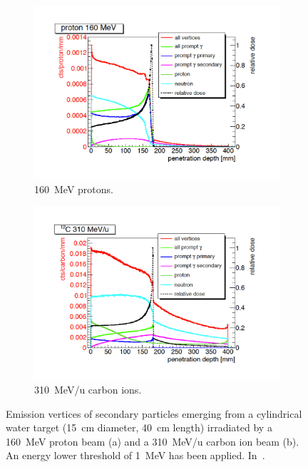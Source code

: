 \begin{figure}
\centering
\begin{subfigure}[t]{.49\textwidth}
\hspace{-1cm}\includegraphics[width=1.3\linewidth]{03_GraphicFiles/chapter2_GammaCameras/PG_secPartDistr_p.pdf}
\caption{160~MeV protons.}
\label{chap2::fig::PGsecDistrp}
\end{subfigure}
\begin{subfigure}[t]{.49\textwidth}
\hspace{-1cm}\includegraphics[width=1.3\linewidth]{03_GraphicFiles/chapter2_GammaCameras/PG_secPartDistr_C.pdf}
\caption{310~MeV/u carbon ions.}
\label{chap2::fig::PGsecDistrC}
\end{subfigure}
\caption{Emission vertices of secondary particles emerging from a cylindrical water target (15~cm diameter, 40~cm length) irradiated by a 160~MeV proton beam (a) and a 310~MeV/u carbon ion beam (b). An energy lower threshold of 1~MeV has been applied. In~\cite{Krimmer2017}.}
\label{chap2::fig::PGsecDistr_gen}
\end{figure}

